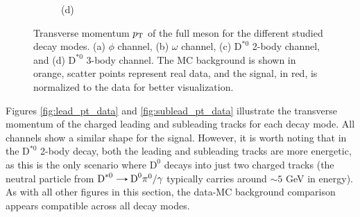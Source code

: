 \begin{figure}[!ht]
\begin{subfigure}[t]{0.50\mylength}
        \vspace*{-0.2cm}
        \caption{\footnotesize (d)}
    \end{subfigure}%
\caption{Transverse momentum $p_\text{T}$ of the full meson for the different studied decay modes. (a) $\phi$ channel, (b) $\omega$ channel, (c) $\text{D}^{*0}$ 2-body channel, and (d) $\text{D}^{*0}$ 3-body channel. The MC background is shown in orange, scatter points represent real data, and the signal, in red, is normalized to the data for better visualization.}
\label{fig:full_pt_data}
    \vspace*{-0.0cm}
\end{figure}

Figures \ref{fig:lead_pt_data} and \ref{fig:sublead_pt_data} illustrate the transverse momentum of the charged leading and subleading tracks for each decay mode. All channels show a similar shape for the signal. However, it is worth noting that in the $\text{D}^{*0}$ 2-body decay, both the leading and subleading tracks are more energetic, as this is the only scenario where $\text{D}^{0}$ decays into just two charged tracks (the neutral particle from $\text{D}^{*0}\decaysto \text{D}^{0}\pi^{0}/\gamma$ typically carries around $\sim5$ GeV in energy). As with all other figures in this section, the data-MC background comparison appears compatible across all decay modes.

